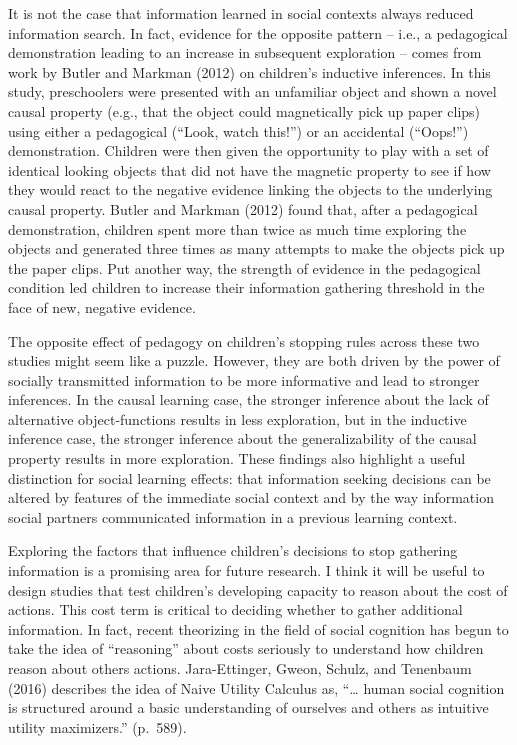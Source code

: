 \documentclass[english,floatsintext,man]{apa6}
\theoremstyle{definition}
\theoremstyle{definition}
\theoremstyle{definition}
\theoremstyle{remark}
\begin{document}
It is not the case that information learned in social contexts always
reduced information search. In fact, evidence for the opposite pattern
-- i.e., a pedagogical demonstration leading to an increase in
subsequent exploration -- comes from work by Butler and Markman (2012)
on children's inductive inferences. In this study, preschoolers were
presented with an unfamiliar object and shown a novel causal property
(e.g., that the object could magnetically pick up paper clips) using
either a pedagogical (\enquote{Look, watch this!}) or an accidental
(\enquote{Oops!}) demonstration. Children were then given the
opportunity to play with a set of identical looking objects that did not
have the magnetic property to see if how they would react to the
negative evidence linking the objects to the underlying causal property.
Butler and Markman (2012) found that, after a pedagogical demonstration,
children spent more than twice as much time exploring the objects and
generated three times as many attempts to make the objects pick up the
paper clips. Put another way, the strength of evidence in the
pedagogical condition led children to increase their information
gathering threshold in the face of new, negative evidence.

The opposite effect of pedagogy on children's stopping rules across
these two studies might seem like a puzzle. However, they are both
driven by the power of socially transmitted information to be more
informative and lead to stronger inferences. In the causal learning
case, the stronger inference about the lack of alternative
object-functions results in less exploration, but in the inductive
inference case, the stronger inference about the generalizability of the
causal property results in more exploration. These findings also
highlight a useful distinction for social learning effects: that
information seeking decisions can be altered by features of the
immediate social context and by the way information social partners
communicated information in a previous learning context.

Exploring the factors that influence children's decisions to stop
gathering information is a promising area for future research. I think
it will be useful to design studies that test children's developing
capacity to reason about the cost of actions. This cost term is critical
to deciding whether to gather additional information. In fact, recent
theorizing in the field of social cognition has begun to take the idea
of \enquote{reasoning} about costs seriously to understand how children
reason about others actions. Jara-Ettinger, Gweon, Schulz, and Tenenbaum
(2016) describes the idea of Naive Utility Calculus as,
\enquote{\ldots{} human social cognition is structured around a basic
understanding of ourselves and others as intuitive utility maximizers.}
(p.~589).
\end{document}

